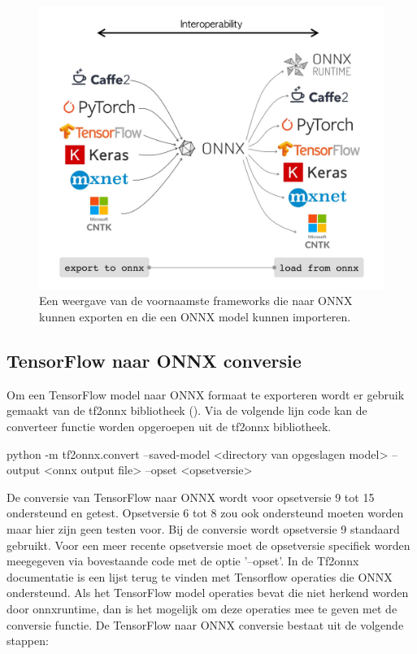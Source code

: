 \begin{figure}[!ht]
    \centering
 	\includegraphics[width=0.7\linewidth]{fig/onnx.jpeg}
 	\caption{Een weergave van de voornaamste frameworks die naar ONNX kunnen exporten en die een ONNX model kunnen importeren.}
 	\label{fig:onnx}
\end{figure}

\subsection{TensorFlow naar ONNX conversie}
Om een TensorFlow model naar ONNX formaat te exporteren wordt er gebruik gemaakt van de tf2onnx bibliotheek (\cite{onnx_tf2onnx_2021}).
Via de volgende lijn code kan de converteer functie worden opgeroepen uit de tf2onnx bibliotheek.

\begin{python}
python -m tf2onnx.convert --saved-model <directory van opgeslagen model> 
		--output <onnx output file> --opset <opsetversie>
\end{python}

De conversie van TensorFlow naar ONNX wordt voor opsetversie 9 tot 15 ondersteund en getest.
Opsetversie 6 tot 8 zou ook ondersteund moeten worden maar hier zijn geen testen voor.
Bij de conversie wordt opsetversie 9 standaard gebruikt.
Voor een meer recente opsetversie moet de opsetversie specifiek worden meegegeven via bovestaande code met de optie '--opset'.
In de Tf2onnx documentatie is een lijst terug te vinden met Tensorflow operaties die ONNX ondersteund.
Als het TensorFlow model operaties bevat die niet herkend worden door onnxruntime, dan is het mogelijk om deze operaties mee te geven met de conversie functie.
De TensorFlow naar ONNX conversie bestaat uit de volgende stappen: 


